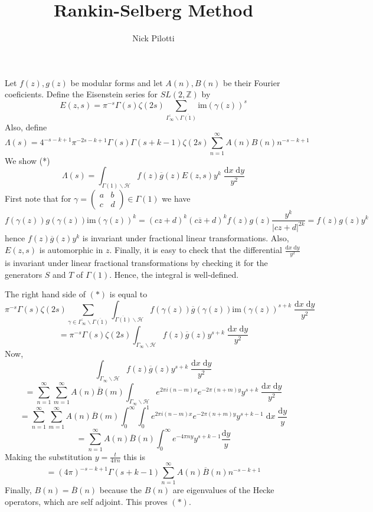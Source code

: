 \documentclass[12pt, letterpaper, twoside]
{article}
\title{Rankin-Selberg Method}
\author{Nick Pilotti}
\newcommand{\Z}{{\mathbb Z}} %
\newcommand{\dd}[1]{\mathrm{d}#1} %
\newcommand{\img}{{\text{im}}} %
\newcommand{\ol}{\overline}
\begin{document}
\maketitle

Let $f(z), g(z)$ be modular forms and let $A(n), B(n)$ be their Fourier
coeficients. Define the Eisenstein series for $SL(2, \Z)$ by
\[E(z, s) = \pi^{-s} \Gamma(s) \zeta(2s) \sum_{\ol{\Gamma_\infty}
\backslash \ol{\Gamma(1)}} \img (\gamma(z))^s\] Also, define
\[\Lambda(s) = 4^{-s-k+1}\pi^{-2s-k+1}\Gamma(s)\Gamma(s + k - 1)\zeta(2s) \sum_{n = 1}^\infty
A(n)B(n)n^{-s-k+1}\] We show (*)
\[\Lambda(s) = \int_{\Gamma(1) \backslash \mathcal{H}} f(z) \ol{g}(z) E(z, s)
y^k \; \frac{\dd x \; \dd y}{y^2}\] First note that for $\gamma =
\begin{pmatrix} a & b \\ c & d \end{pmatrix} \in \Gamma(1)$ we have
\[f(\gamma(z))g(\gamma(z))\img(\gamma(z))^k = (cz + d)^k(c\ol{z} + d)^k f(z)
g(z) \frac{y^k}{|cz + d|^{2k}} = f(z)g(z)y^k\] hence $f(z) \ol{g}(z) y^k$ is
invariant under fractional linear transformations. Also, $E(z, s)$ is
automorphic in $z$. Finally, it is easy to check that the differential $\frac{\dd x
\; \dd y}{y^2}$ is invariant under linear fractional transformations by checking
it for the generators $S$ and $T$ of $\Gamma(1)$. Hence, the integral is
well-defined. 

The right hand side of $(*)$ is equal to
\[\pi^{-s}\Gamma(s)\zeta(2s) \sum_{\gamma \in \ol{\Gamma_\infty} \backslash
\ol{\Gamma(1)}} \int_{\ol{\Gamma(1)} \backslash \mathcal{H}} f(\gamma(z))\ol{g}(\gamma(z))
\img(\gamma(z))^{s + k} \; \frac{\dd x \; \dd y}{y^2}\]
\[= \pi^{-s}\Gamma(s) \zeta(2s) \int_{\Gamma_\infty \backslash \mathcal{H}}
f(z)\ol{g}(z)y^{s + k} \; \frac{\dd x \; \dd y}{y^2}\]
Now,
\[\int_{\Gamma_\infty \backslash \mathcal{H}} f(z) \ol{g}(z) y^{s + k} \; \frac{\dd x \; \dd y}{y^2}\]
\[= \sum_{n = 1}^\infty \sum_{m = 1}^\infty A(n)\ol{B}(m) \int_{\Gamma_\infty \backslash \mathcal{H}} e^{2\pi i (n - m) x} e^{-2 \pi (n + m)y} y^{s + k} \; \frac{\dd x \; \dd y}{y^2}\]
\[= \sum_{n = 1}^\infty \sum_{m = 1}^\infty A(n)\ol{B}(m) \int_0^\infty \int_0^1 e^{2\pi i (n - m)x}e^{-2\pi(n + m)y} y^{s + k - 1} \; \dd x \; \frac{\dd y}{y}\]
\[= \sum_{n = 1}^\infty A(n)\ol{B}(n) \int_0^\infty e^{-4\pi n y}y^{s + k - 1} \frac{\dd y}{y}\]
Making the substitution $y = \frac{t}{4\pi n}$ this is
\[= (4\pi)^{-s - k + 1} \Gamma(s+k-1) \sum_{n = 1}^\infty A(n)\ol{B}(n) n^{-s-k+1}\]
Finally, $B(n) = \ol{B}(n)$ because the $B(n)$ are eigenvalues of the Hecke operators, which are self adjoint. This proves $(*)$.
\end{document}

